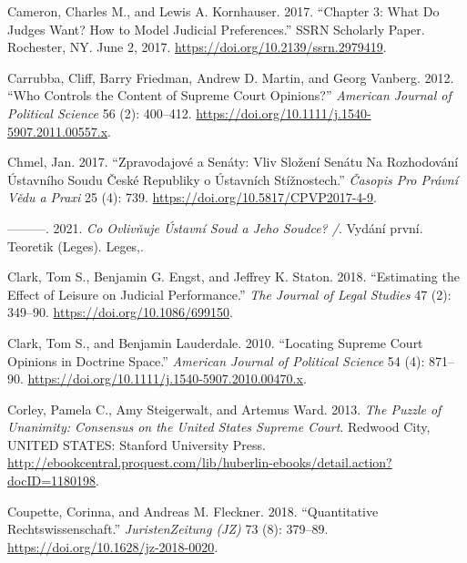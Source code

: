 \documentclass[
  11pt,
]{article}
\newlength{\cslhangindent}
\newenvironment{CSLReferences}[2] %
 {%
  \setlength{\parindent}{0pt}
  \ifodd #1 \everypar{\setlength{\hangindent}{\cslhangindent}}\ignorespaces\fi
  \ifnum #2 > 0
  \setlength{\parskip}{#2\baselineskip}
  \fi
 }%
 {}
\begin{document}
\begin{CSLReferences}{1}{0}
\leavevmode{}%
Cameron, Charles M., and Lewis A. Kornhauser. 2017. {``Chapter 3: {What
Do Judges Want}? {How} to {Model Judicial Preferences}.''} SSRN
Scholarly Paper. {Rochester, NY}. June 2, 2017.
\url{https://doi.org/10.2139/ssrn.2979419}.

\leavevmode{}%
Carrubba, Cliff, Barry Friedman, Andrew D. Martin, and Georg Vanberg.
2012. {``Who {Controls} the {Content} of {Supreme Court Opinions}?''}
\emph{American Journal of Political Science} 56 (2): 400--412.
\url{https://doi.org/10.1111/j.1540-5907.2011.00557.x}.

\leavevmode{}%
Chmel, Jan. 2017. {``Zpravodajové a Senáty: {Vliv} Složení Senátu Na
Rozhodování {Ústavního} Soudu {České} Republiky o Ústavních
Stížnostech.''} \emph{Časopis Pro Právní Vědu a Praxi} 25 (4): 739.
\url{https://doi.org/10.5817/CPVP2017-4-9}.

\leavevmode{}%
---------. 2021. \emph{Co Ovlivňuje {Ústavní} Soud a Jeho Soudce? /}.
Vydání první. Teoretik ({Leges}). {Leges,}.

\leavevmode{}%
Clark, Tom S., Benjamin G. Engst, and Jeffrey K. Staton. 2018.
{``Estimating the {Effect} of {Leisure} on {Judicial Performance}.''}
\emph{The Journal of Legal Studies} 47 (2): 349--90.
\url{https://doi.org/10.1086/699150}.

\leavevmode{}%
Clark, Tom S., and Benjamin Lauderdale. 2010. {``Locating {Supreme Court
Opinions} in {Doctrine Space}.''} \emph{American Journal of Political
Science} 54 (4): 871--90.
\url{https://doi.org/10.1111/j.1540-5907.2010.00470.x}.

\leavevmode{}%
Corley, Pamela C., Amy Steigerwalt, and Artemus Ward. 2013. \emph{The
{Puzzle} of {Unanimity}: {Consensus} on the {United States Supreme
Court}}. {Redwood City, UNITED STATES}: {Stanford University Press}.
\url{http://ebookcentral.proquest.com/lib/huberlin-ebooks/detail.action?docID=1180198}.

\leavevmode{}%
Coupette, Corinna, and Andreas M. Fleckner. 2018. {``Quantitative
{Rechtswissenschaft}.''} \emph{JuristenZeitung (JZ)} 73 (8): 379--89.
\url{https://doi.org/10.1628/jz-2018-0020}.


\end{CSLReferences}
\end{document}
